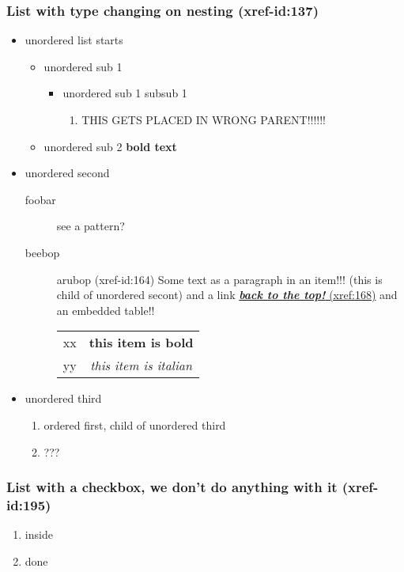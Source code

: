\documentclass[11pt]{article}
\begin{document}
\subsubsection{List with type changing on nesting   (xref-id:137)  }
 \label{obj-137}
 \label{obj-136}
\begin{itemize}
\item
unordered list starts
\begin{itemize}
\item
unordered sub 1
\begin{itemize}
\item
unordered sub 1 subsub 1
\begin{enumerate}
\item
THIS GETS PLACED IN WRONG PARENT!!!!!!
\end{enumerate}
\end{itemize}
\item
unordered sub 2
\textbf{bold text}
\end{itemize}
\item
unordered second 
\begin{description}
\item[foobar]
see a pattern?
\item[beebop]
arubop
\label{obj-164} (xref-id:164)
  Some text as a paragraph in an item!!! (this is child of unordered secont)
and a link
\hyperref[obj-15]{\textbf{\emph{back to the top!}} (xref:168)}
  and an embedded table!!

\begin{tabular}{|c|c|}
\hline
 xx  & \textbf{this item is bold} \\
 yy  & \emph{this item is italian} \\
\hline
\end{tabular}
\end{description}
\item
unordered third
\begin{enumerate}
\item
ordered first, child of unordered third
\item
???
\end{enumerate}
\vspace{\baselineskip}
\vspace{\baselineskip}
\end{itemize}
\vspace{\baselineskip}
\subsubsection{List with a checkbox, we don't do anything with it   (xref-id:195)  }
 \label{obj-195}
 \label{obj-194}
\begin{enumerate}
\item
inside
\item
done
\vspace{\baselineskip}
\vspace{\baselineskip}
\end{enumerate}
\end{document}

